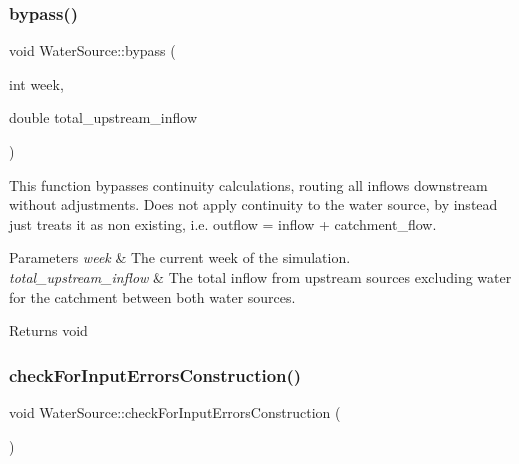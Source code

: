 \mbox{\label{classWaterSource_abeb8ba4b51c2b270baf9162df76d8b58}} 
\subsubsection{\texorpdfstring{bypass()}{bypass()}}
{\footnotesize\ttfamily void Water\+Source\+::bypass (\begin{DoxyParamCaption}\item[{int}]{week,  }\item[{double}]{total\+\_\+upstream\+\_\+inflow }\end{DoxyParamCaption})\hspace{0.3cm}{\ttfamily [protected]}}



This function bypasses continuity calculations, routing all inflows downstream without adjustments. Does not apply continuity to the water source, by instead just treats it as non existing, i.\+e. outflow = inflow + catchment\+\_\+flow. 


\begin{DoxyParams}{Parameters}
{\em week} & The current week of the simulation. \\
\hline
{\em total\+\_\+upstream\+\_\+inflow} & The total inflow from upstream sources excluding water for the catchment between both water sources.\\
\hline
\end{DoxyParams}
\begin{DoxyReturn}{Returns}
void 
\end{DoxyReturn}
\mbox{\label{classWaterSource_a47bc2006a1ef6ea4429d56a24319940f}} 
\subsubsection{\texorpdfstring{check\+For\+Input\+Errors\+Construction()}{checkForInputErrorsConstruction()}}
{\footnotesize\ttfamily void Water\+Source\+::check\+For\+Input\+Errors\+Construction (\begin{DoxyParamCaption}{ }\end{DoxyParamCaption})}



